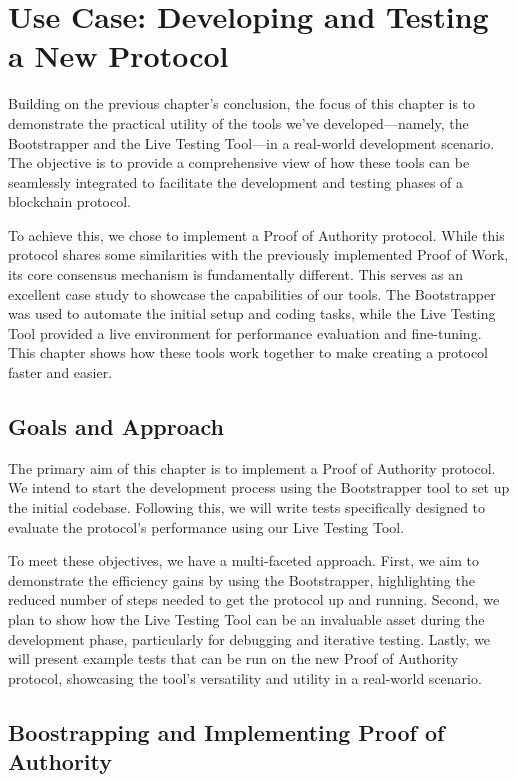 \chapter{Use Case: Developing and Testing a New Protocol}

Building on the previous chapter's conclusion, the focus of this chapter is to demonstrate the practical utility of the tools we've developed—namely, the Bootstrapper and the Live Testing Tool—in a real-world development scenario. The objective is to provide a comprehensive view of how these tools can be seamlessly integrated to facilitate the development and testing phases of a blockchain protocol.

To achieve this, we chose to implement a Proof of Authority protocol. While this protocol shares some similarities with the previously implemented Proof of Work, its core consensus mechanism is fundamentally different. This serves as an excellent case study to showcase the capabilities of our tools. The Bootstrapper was used to automate the initial setup and coding tasks, while the Live Testing Tool provided a live environment for performance evaluation and fine-tuning. This chapter shows how these tools work together to make creating a protocol faster and easier.



\section{Goals and Approach}
The primary aim of this chapter is to implement a Proof of Authority protocol. We intend to start the development process using the Bootstrapper tool to set up the initial codebase. Following this, we will write tests specifically designed to evaluate the protocol's performance using our Live Testing Tool.

To meet these objectives, we have a multi-faceted approach. First, we aim to demonstrate the efficiency gains by using the Bootstrapper, highlighting the reduced number of steps needed to get the protocol up and running. Second, we plan to show how the Live Testing Tool can be an invaluable asset during the development phase, particularly for debugging and iterative testing. Lastly, we will present example tests that can be run on the new Proof of Authority protocol, showcasing the tool's versatility and utility in a real-world scenario.

\section{Boostrapping and Implementing Proof of Authority}

